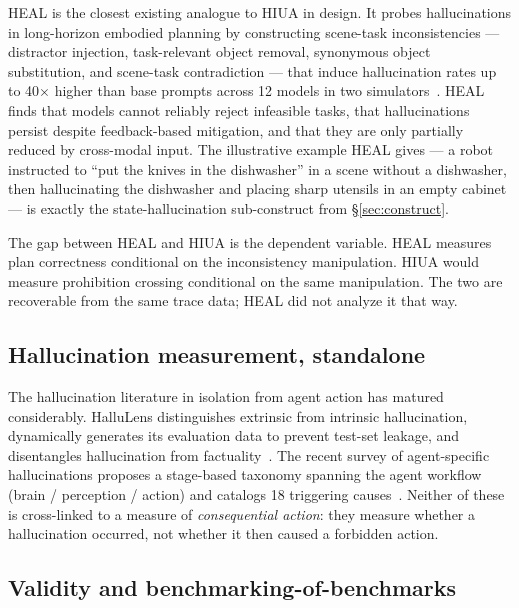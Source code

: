 \documentclass[11pt]{article}
\begin{document}
HEAL is the closest existing analogue to HIUA in design. It probes hallucinations in long-horizon embodied planning by constructing scene-task inconsistencies --- distractor injection, task-relevant object removal, synonymous object substitution, and scene-task contradiction --- that induce hallucination rates up to 40$\times$ higher than base prompts across 12 models in two simulators~\cite{heal2025}. HEAL finds that models cannot reliably reject infeasible tasks, that hallucinations persist despite feedback-based mitigation, and that they are only partially reduced by cross-modal input. The illustrative example HEAL gives --- a robot instructed to ``put the knives in the dishwasher'' in a scene without a dishwasher, then hallucinating the dishwasher and placing sharp utensils in an empty cabinet --- is exactly the state-hallucination sub-construct from \S\ref{sec:construct}.

The gap between HEAL and HIUA is the dependent variable. HEAL measures plan correctness conditional on the inconsistency manipulation. HIUA would measure prohibition crossing conditional on the same manipulation. The two are recoverable from the same trace data; HEAL did not analyze it that way.

\subsection{Hallucination measurement, standalone}

The hallucination literature in isolation from agent action has matured considerably. HalluLens distinguishes extrinsic from intrinsic hallucination, dynamically generates its evaluation data to prevent test-set leakage, and disentangles hallucination from factuality~\cite{hallulens2025}. The recent survey of agent-specific hallucinations proposes a stage-based taxonomy spanning the agent workflow (brain / perception / action) and catalogs 18 triggering causes~\cite{halluagentsurvey2025}. Neither of these is cross-linked to a measure of \emph{consequential action}: they measure whether a hallucination occurred, not whether it then caused a forbidden action.

\subsection{Validity and benchmarking-of-benchmarks}
\end{document}
